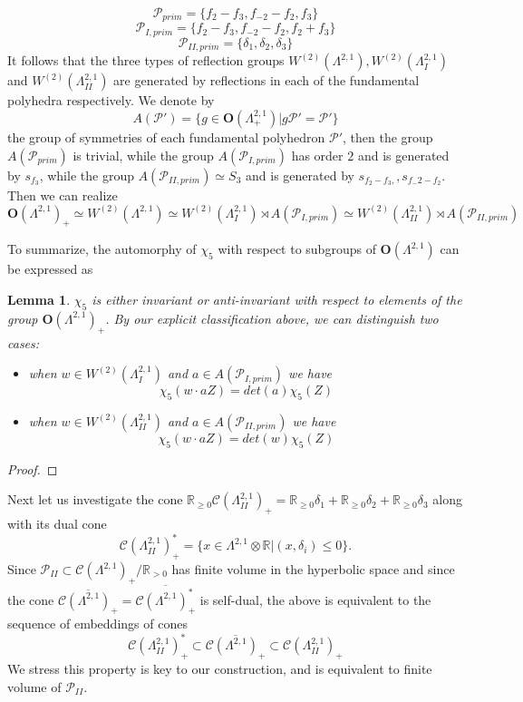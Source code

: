 \documentclass[9pt]{amsart} \usepackage[utf8]{inputenc}
\newtheorem{lemma}{Lemma}
\newcommand{\R}{\mathbb{R}} \newcommand{\La}{\Lambda}
\newcommand{\Orth}{\mathbf{O}}
\newcommand{\Cone}{\mathcal{C}}
\newcommand{\Poly}{\mathcal{P}}
\begin{document}
 $$\Poly_{prim} = \{f_2 - f_3, f_{-2} - f_2, f_3\}$$
 $$\Poly_{I,prim} = \{f_2 -f_3, f_{-2} - f_2, f_2 + f_3\}$$
 $$\Poly_{II,prim} = \{\delta_1, \delta_2, \delta_3\}$$
It follows that the three types of reflection groups $W^{(2)}(\La^{2,1}),
W^{(2)}(\La^{2,1}_I)$ and $W^{(2)}(\La^{2,1}_{II})$ are generated by
reflections in each of the fundamental polyhedra respectively. We denote
by $$A(\Poly') = \{g \in \Orth(\La^{2,1}_+) | g \Poly' = \Poly' \}$$ the
group of symmetries of each fundamental polyhedron $\Poly'$, then the group
$A(\Poly_{prim})$ is trivial, while the group $A(\Poly_{I,prim})$ has order
$2$ and is generated by $s_{f_3}$, while the group $A(\Poly_{II,prim})
\simeq S_3$ and is generated by $s_{f_2 -f_3,}, s_{f_-2 - f_2}$. Then we
can realize $$\Orth(\La^{2,1})_+ \simeq W^{(2)}(\La^{2,1}) \simeq
W^{(2)}(\La^{2,1}_I) \rtimes A(\Poly_{I,prim}) \simeq
W^{(2)}(\La^{2,1}_{II}) \rtimes A(\Poly_{II,prim})$$

To summarize, the automorphy of $\chi_5$ with respect to subgroups of
$\Orth(\La^{2,1})$ can be expressed as

\begin{lemma}
$\chi_5$ is either invariant or anti-invariant with respect to elements
of the group $\Orth(\La^{2,1})_+$. By our explicit classification above, we can
distinguish two cases:
\begin{itemize}
  \item when $w \in W^{(2)}(\La^{2,1}_I)$ and $a \in A(\Poly_{I,prim})$ we
  have
  $$\chi_5(w \cdot a Z) = det(a) \chi_5(Z)$$
  \item when $w \in W^{(2)}(\La^{2,1}_{II})$ and $a \in A(\Poly_{II,prim})$ we
  have
  $$\chi_5(w \cdot a Z) = det(w) \chi_5(Z)$$
\end{itemize}

\end{lemma}
\begin{proof}
\end{proof}

Next let us investigate the cone $\R_{\geq 0}
\Cone(\La^{2,1}_{II})_+ = \R_{\geq 0} \delta_1 + \R_{\geq 0} \delta_2
+ \R_{\geq 0} \delta_3$ along with its dual cone
$$\Cone(\La^{2,1}_{II})_+^* = \{ x \in \La^{2,1} \otimes \R | (x,
\delta_i) \leq 0 \}.$$ Since $\Poly_{II} \subset \Cone(\La^{2,1})_+ /
\R_{>0}$ has finite volume in the hyperbolic space and since the cone
$\overline{\Cone(\La^{2,1})_+} = \overline{\Cone(\La^{2,1})_+^*}$ is
self-dual, the above is equivalent to the sequence of embeddings of
cones
$$\Cone(\La^{2,1}_{II})_+^* \subset
\overline{\Cone(\La^{2,1})_+} \subset  \Cone(\La^{2,1}_{II})_+$$
We stress this property is key to our construction, and is equivalent to
finite volume of $\Poly_{II}$.
\end{document}
